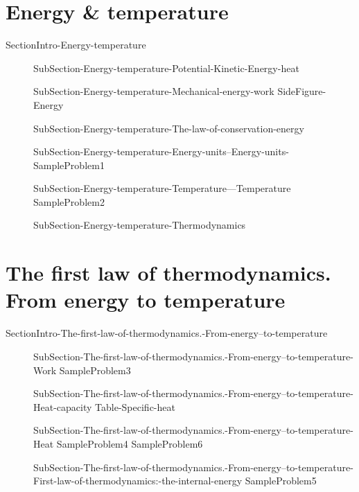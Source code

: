 \documentclass[main.tex]{subfiles}
\newcommand\chapterlabel{Ch-thermochemistry}\setcounter{figurenewcounter}{0}\setcounter{tablenewcounter}{0}\setcounter{formulanewcounter}{0}
\begin{document}
\section{Energy \& temperature}
{SectionIntro-Energy-temperature}
\sloppy\begin{description}
\item[] 
  {SubSection-Energy-temperature-Potential-Kinetic-Energy-heat}
\item[] 
  {SubSection-Energy-temperature-Mechanical-energy-work}
   {SideFigure-Energy}
\item[]
  {SubSection-Energy-temperature-The-law-of-conservation-energy}
\item[] 
  {SubSection-Energy-temperature-Energy-units--Energy-units-}
   {SampleProblem1}
\item[]
  {SubSection-Energy-temperature-Temperature---Temperature}
   {SampleProblem2}
\item[] 
  {SubSection-Energy-temperature-Thermodynamics}
\end{description}
\section{The first law of thermodynamics. From energy  to temperature}
{SectionIntro-The-first-law-of-thermodynamics.-From-energy--to-temperature}
\sloppy\begin{description}
\item[] 
  {SubSection-The-first-law-of-thermodynamics.-From-energy--to-temperature-Work}
   {SampleProblem3}
\item[] 
  {SubSection-The-first-law-of-thermodynamics.-From-energy--to-temperature-Heat-capacity}
   {Table-Specific-heat}
\item[] 
  {SubSection-The-first-law-of-thermodynamics.-From-energy--to-temperature-Heat}
   {SampleProblem4}
      {SampleProblem6}
\item[] 
  {SubSection-The-first-law-of-thermodynamics.-From-energy--to-temperature-First-law-of-thermodynamics:-the-internal-energy}
   {SampleProblem5}

\end{description}
\end{document}
